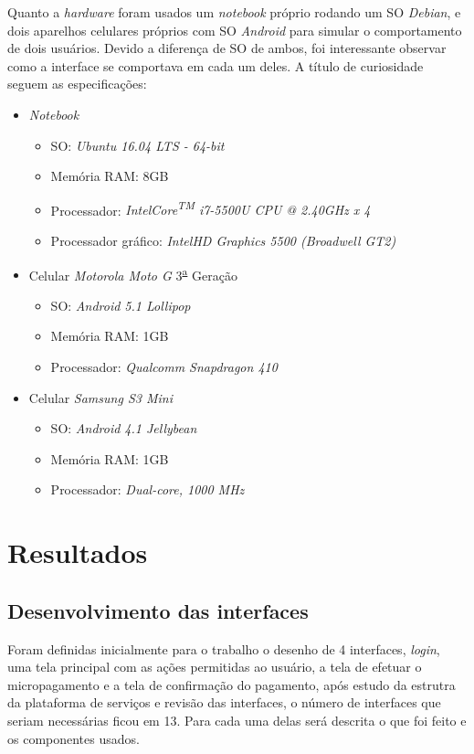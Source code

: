 \documentclass[hidelinks,12pt]{article}
\begin{document}
Quanto a \textit{hardware} foram usados um \textit{notebook} pr\'oprio rodando um SO \textit{Debian}, e dois aparelhos celulares pr\'oprios com SO \textit{Android} para simular o comportamento de dois usu\'arios. Devido a diferen\c{c}a de SO de ambos, foi interessante observar como a interface se comportava em cada um deles. A t\'itulo de curiosidade seguem as especifica\c{c}\~oes:
\begin{itemize}
	\item \textit{Notebook}
	\begin{itemize}
		\item SO: \textit{Ubuntu 16.04 LTS - 64-bit}
		\item Mem\'oria RAM: 8GB
		\item Processador: \textit{Intel\textregistered Core\textsuperscript{TM} i7-5500U CPU @ 2.40GHz x 4}
		\item Processador gr\'afico: \textit{Intel\textregistered HD Graphics 5500 (Broadwell GT2)}
	\end{itemize}
	\item Celular \textit{Motorola Moto G} 3\textsuperscript{\underline{a}} Gera\c{c}\~ao
	\begin{itemize}
		\item SO: \textit{Android 5.1 Lollipop}
		\item Mem\'oria RAM: 1GB
		\item Processador: \textit{Qualcomm Snapdragon 410}
	\end{itemize}
	\item Celular \textit{Samsung S3 Mini}
	\begin{itemize}
		\item SO: \textit{Android 4.1 Jellybean}
		\item Mem\'oria RAM: 1GB
		\item Processador: \textit{Dual-core, 1000 MHz}
	\end{itemize}
\end{itemize}
\newpage
\section{Resultados}

\subsection{Desenvolvimento das interfaces} \label{learn}
Foram definidas inicialmente para o trabalho o desenho de 4 interfaces, \textit{login}, uma tela principal com as a\c{c}\~oes permitidas ao usu\'ario, a tela de efetuar o micropagamento e a tela de confirma\c{c}\~ao do pagamento, ap\'os estudo da estrutra da plataforma de servi\c{c}os e revis\~ao das interfaces, o número de interfaces que seriam necess\'arias ficou em 13. Para cada uma delas ser\'a descrita o que foi feito e os componentes usados.
\end{document}
